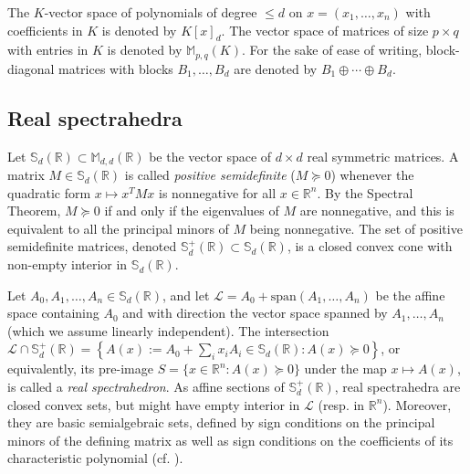 \documentclass[a4paper,12pt]{article}
\newcommand{\R}{\mathbb{R}} %
\newcommand{\allmat}{\mathbb{M}} %
\newcommand{\sym}{\mathbb{S}} %
\renewcommand{\span}[1]{{\text{span}(#1)}} %
\newcommand{\calL}{\mathcal{L}} %
\begin{document}
The $K$-vector space of polynomials of degree $\leq d$ on $x=(x_1,\ldots,x_n)$
with coefficients in $K$ is denoted by $K[x]_{d}$. The vector space of matrices of
size $p \times q$ with entries in $K$ is denoted by $\allmat_{p,q}(K)$. For the sake
of ease of writing, block-diagonal matrices with blocks $B_1,\ldots,B_d$ are denoted by
$B_1 \oplus \cdots \oplus B_d$.

\subsection{Real spectrahedra}

Let $\sym_d(\R) \subset \allmat_{d,d}(\R)$ be the vector space of $d \times d$ real symmetric
matrices. A matrix $M \in \sym_d(\R)$
is called {\it positive semidefinite} ($M \succeq 0$) whenever the quadratic
form $x \mapsto x^TMx$ is nonnegative for all $x\in \R^n$. By the Spectral Theorem, $M \succeq 0$
if and only if the eigenvalues of $M$ are nonnegative, and this is equivalent to all the principal minors
of $M$ being nonnegative. The set of positive semidefinite matrices, denoted $\sym_d^+(\R) \subset \sym_d(\R)$,
is a closed convex cone with non-empty interior in $\sym_d(\R)$.

Let $A_0,A_1,\ldots,A_n \in \sym_d(\R)$, and let $\calL = A_0+\span{A_1,\ldots,A_n}$ be the affine space
containing $A_0$ and with direction the vector space spanned by $A_1,\ldots,A_n$ (which we assume linearly
independent). The intersection $\calL \cap \sym_d^+(\R) = \left\{A(x) := A_0+\sum_i x_i A_i \in \sym_d(\R) :
A(x) \succeq 0\right\}$, or
equivalently, its pre-image $S = \{x \in \R^n : A(x) \succeq 0\}$ under the map $x \mapsto A(x)$, is called
a {\it real spectrahedron}. As affine sections of $\sym_d^+(\R)$, real spectrahedra are closed convex sets,
but might have empty interior in $\calL$ (resp. in $\R^n$). Moreover, they are basic semialgebraic sets,
defined by sign conditions on the principal minors of the defining matrix as well as sign conditions on the
coefficients of its characteristic polynomial (cf. ).
\end{document}
